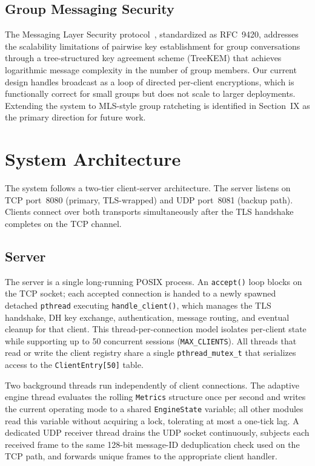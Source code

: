 \documentclass[conference]{IEEEtran}
\begin{document}
\subsection{Group Messaging Security}

The Messaging Layer Security protocol~\cite{b5}, standardized as RFC~9420, addresses
the scalability limitations of pairwise key establishment for group conversations through
a tree-structured key agreement scheme (TreeKEM) that achieves logarithmic message
complexity in the number of group members. Our current design handles broadcast as a
loop of directed per-client encryptions, which is functionally correct for small groups
but does not scale to larger deployments. Extending the system to MLS-style group
ratcheting is identified in Section~IX as the primary direction for future work.

\section{System Architecture}

The system follows a two-tier client-server architecture. The server listens on TCP
port~8080 (primary, TLS-wrapped) and UDP port~8081 (backup path). Clients connect over
both transports simultaneously after the TLS handshake completes on the TCP channel.

\subsection{Server}

The server is a single long-running POSIX process. An \texttt{accept()} loop blocks on
the TCP socket; each accepted connection is handed to a newly spawned detached
\texttt{pthread} executing \texttt{handle\_client()}, which manages the TLS handshake,
DH key exchange, authentication, message routing, and eventual cleanup for that client.
This thread-per-connection model isolates per-client state while supporting up to 50
concurrent sessions (\texttt{MAX\_CLIENTS}). All threads that read or write the client
registry share a single \texttt{pthread\_mutex\_t} that serializes access to the
\texttt{ClientEntry[50]} table.

Two background threads run independently of client connections. The adaptive engine
thread evaluates the rolling \texttt{Metrics} structure once per second and writes the
current operating mode to a shared \texttt{EngineState} variable; all other modules
read this variable without acquiring a lock, tolerating at most a one-tick lag. A
dedicated UDP receiver thread drains the UDP socket continuously, subjects each received
frame to the same 128-bit message-ID deduplication check used on the TCP path, and
forwards unique frames to the appropriate client handler.
\end{document}
